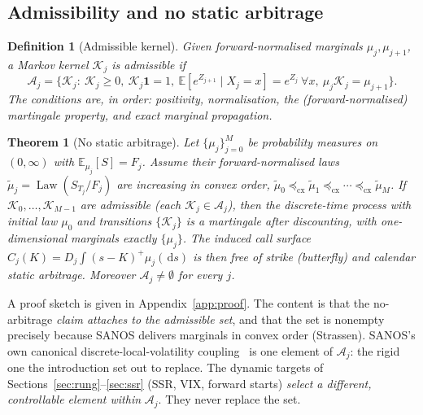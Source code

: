 \documentclass[11pt]{article}
\newtheorem{theorem}{Theorem}
\newtheorem{definition}{Definition}
\newcommand{\E}{\mathbb{E}}
\newcommand{\law}{\operatorname{Law}}
\newcommand{\cK}{\mathcal{K}}
\newcommand{\cA}{\mathcal{A}}
\newcommand{\cxle}{\preceq_{\mathrm{cx}}}
\newcommand{\dd}{\,\mathrm{d}}
\begin{document}
\subsection{Admissibility and no static arbitrage}
\begin{definition}[Admissible kernel]
Given forward-normalised marginals $\mu_j,\mu_{j+1}$, a Markov kernel $\cK_j$ is
\emph{admissible} if
\begin{equation}
\cA_j=\Big\{\cK_j:\ \cK_j\ge 0,\ \cK_j\mathbf 1=1,\
\E[e^{Z_{j+1}}\mid X_j=x]=e^{Z_j}\ \forall x,\
\mu_j \cK_j=\mu_{j+1}\Big\}.
\label{eq:admissible}
\end{equation}
The conditions are, in order: positivity, normalisation, the (forward-normalised)
martingale property, and exact marginal propagation.
\end{definition}

\begin{theorem}[No static arbitrage]
\label{thm:noarb}
Let $\{\mu_j\}_{j=0}^M$ be probability measures on $(0,\infty)$ with
$\E_{\mu_j}[S]=F_j$. Assume their forward-normalised laws $\tilde\mu_j=\law(S_{T_j}/F_j)$ are
increasing in convex order, $\tilde\mu_0\cxle\tilde\mu_1\cxle\cdots\cxle\tilde\mu_M$.
If $\cK_0,\dots,\cK_{M-1}$ are admissible (each $\cK_j\in\cA_j$), then the discrete-time
process with initial law $\mu_0$ and transitions $\{\cK_j\}$ is a martingale after
discounting, with one-dimensional marginals exactly $\{\mu_j\}$. The induced call surface
$C_j(K)=D_j\int(s-K)^+\mu_j(\dd s)$ is then free of strike (butterfly) and calendar static
arbitrage. Moreover $\cA_j\neq\emptyset$ for every $j$.
\end{theorem}

\noindent A proof sketch is given in Appendix~\ref{app:proof}. The content is that the
no-arbitrage \emph{claim attaches to the admissible set}, and that the set is nonempty
precisely because SANOS delivers marginals in convex order (Strassen). SANOS's own canonical
discrete-local-volatility coupling~\cite{buehler2026sanos} is one element of $\cA_j$: the
rigid one the introduction set out to replace. The dynamic targets of
Sections~\ref{sec:rung}--\ref{sec:ssr} (SSR, VIX, forward starts) \emph{select a different,
controllable element within} $\cA_j$. They never replace the set.
\end{document}

